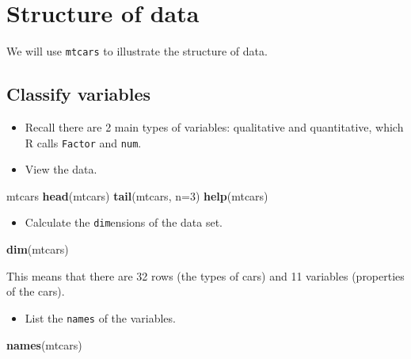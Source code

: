 \documentclass[]{article}
\newenvironment{Shaded}{\begin{snugshade}}{\end{snugshade}}
\newcommand{\DataTypeTok}[1]{\textcolor[rgb]{0.13,0.29,0.53}{#1}}
\newcommand{\DecValTok}[1]{\textcolor[rgb]{0.00,0.00,0.81}{#1}}
\newcommand{\KeywordTok}[1]{\textcolor[rgb]{0.13,0.29,0.53}{\textbf{#1}}}
\newcommand{\NormalTok}[1]{#1}
\providecommand{\tightlist}{%
  \setlength{\itemsep}{0pt}\setlength{\parskip}{0pt}}
\begin{document}
\hypertarget{structure-of-data}{%
\section{Structure of data}\label{structure-of-data}}

We will use \texttt{mtcars} to illustrate the structure of data.

\hypertarget{classify-variables}{%
\subsection{Classify variables}\label{classify-variables}}

\begin{itemize}
\item
  Recall there are 2 main types of variables: qualitative and quantitative, which R calls \texttt{Factor} and \texttt{num}.
\item
  View the data.
\end{itemize}

\begin{Shaded}
\begin{Highlighting}[]
\NormalTok{mtcars}
\KeywordTok{head}\NormalTok{(mtcars)}
\KeywordTok{tail}\NormalTok{(mtcars, }\DataTypeTok{n=}\DecValTok{3}\NormalTok{)}
\KeywordTok{help}\NormalTok{(mtcars)}
\end{Highlighting}
\end{Shaded}

\begin{itemize}
\tightlist
\item
  Calculate the \texttt{dim}ensions of the data set.
\end{itemize}

\begin{Shaded}
\begin{Highlighting}[]
\KeywordTok{dim}\NormalTok{(mtcars)}
\end{Highlighting}
\end{Shaded}

This means that there are 32 rows (the types of cars) and 11 variables (properties of the cars).

\begin{itemize}
\tightlist
\item
  List the \texttt{names} of the variables.
\end{itemize}

\begin{Shaded}
\begin{Highlighting}[]
\KeywordTok{names}\NormalTok{(mtcars)}
\end{Highlighting}
\end{Shaded}
\end{document}
